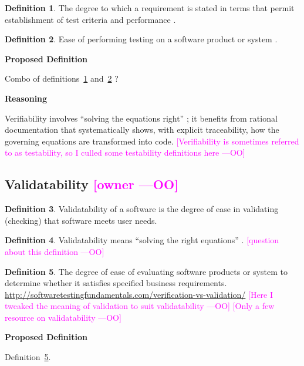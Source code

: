 \documentclass[letterpaper,cleveref]{lipics-v2019}
\newcommand{\authornote}[3]{\textcolor{#1}{[#3 ---#2]}}
\newcommand{\authornote}[3]{}
\newcommand{\oo}[1]{\authornote{magenta}{OO}{#1}} %
\theoremstyle{definition}
\newtheorem{defn}{Definition}
\begin{document}
\begin{defn} \label{Defn_Verifiability1}
  The degree to which a requirement is stated in terms that permit establishment
  of test criteria and performance \citep{IEEEStdGlossarySET1990}.
\end{defn}

\begin{defn} \label{Defn_Verifiability2}
  Ease of performing testing on a software product or system
  \citep{IEEEStdGlossarySET1990}.
\end{defn}

\noindent \textbf{Proposed Definition}

Combo of definitions~\ref{Defn_Verifiability1} and~\ref{Defn_Verifiability2} ?

\noindent \textbf{Reasoning}

Verifiability involves ``solving the equations right'' \citep[p.~23]{Roache1998};
it benefits from rational documentation that systematically shows, with explicit
traceability, how the governing equations are transformed into code.
\oo{Verifiability is sometimes referred to as testability, so I culled some
  testability definitions here}

\subsection{Validatability \oo{owner}}

\begin{defn}
  Validatability of a software is the degree of ease in validating (checking)
  that software meets user needs.
\end{defn}

\begin{defn}
  Validatability means ``solving the right equations'' \citep[p.~23]{Roache1998}.
  \oo{question about this definition}
\end{defn}

\begin{defn} \label{DefnValidatability}
  The degree of ease of evaluating software products or system to determine
  whether it satisfies specified business
  requirements. \url{http://softwaretestingfundamentals.com/verification-vs-validation/}
  \oo{Here I tweaked the meaning of validation to suit validatability} \oo{Only
    a few resource on validatability}
\end{defn}

\noindent \textbf{Proposed Definition}

Definition~\ref{DefnValidatability}.
\end{document}
